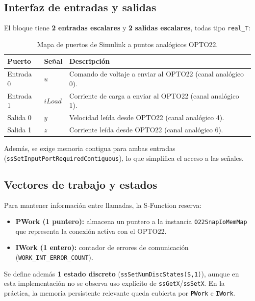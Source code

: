 \subsection{Interfaz de entradas y salidas}
El bloque tiene \textbf{2 entradas escalares} y \textbf{2 salidas escalares}, todas tipo \texttt{real\_T}:

\begin{table}[h]
\centering
\begin{tabular}{lll}
\hline
\textbf{Puerto} & \textbf{Señal} & \textbf{Descripción} \\
\hline
Entrada 0 & $u$      & Comando de voltaje a enviar al OPTO22 (canal analógico 0). \\
Entrada 1 & $iLoad$  & Corriente de carga a enviar al OPTO22 (canal analógico 1). \\
\hline
Salida 0 & $y$      & Velocidad leída desde OPTO22 (canal analógico 4). \\
Salida 1 & $z$      & Corriente leída desde OPTO22 (canal analógico 6). \\
\hline
\end{tabular}
\caption{Mapa de puertos de Simulink a puntos analógicos OPTO22.}
\label{tab:sdcmotor_ports}
\end{table}

\noindent Además, se exige memoria contigua para ambas entradas (\texttt{ssSetInputPortRequiredContiguous}), lo que simplifica el acceso a las señales.

\subsection{Vectores de trabajo y estados}
Para mantener información entre llamadas, la S-Function reserva:
\begin{itemize}
    \item \textbf{PWork (1 puntero):} almacena un puntero a la instancia \texttt{O22SnapIoMemMap} que representa la conexión activa con el OPTO22.
    \item \textbf{IWork (1 entero):} contador de errores de comunicación (\texttt{WORK\_INT\_ERROR\_COUNT}).
\end{itemize}
Se define además \textbf{1 estado discreto} (\texttt{ssSetNumDiscStates(S,1)}), aunque en esta implementación no se observa uso explícito de \texttt{ssGetX}/\texttt{ssSetX}. En la práctica, la memoria persistente relevante queda cubierta por \texttt{PWork} e \texttt{IWork}.

